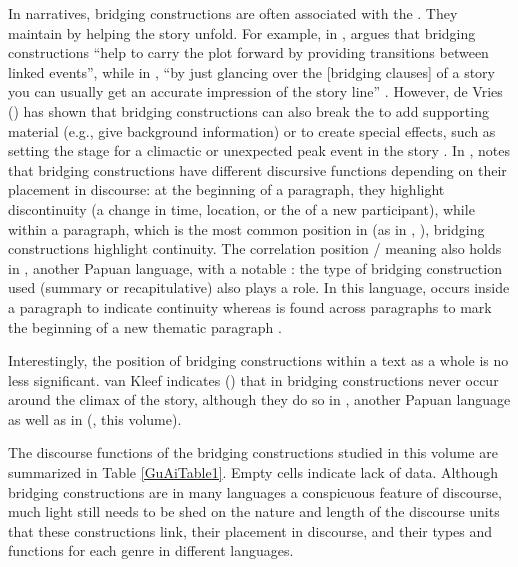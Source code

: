 \documentclass[output=paper]{LSP/langsci}
\begin{document}
In narratives, bridging constructions are often associated with the . They maintain  by helping the story unfold. For example, in , \citet[][1324]{Jendraschek09} argues that bridging constructions ``help to carry the plot forward by providing transitions between linked events'', while in , ``by just glancing over the [bridging clauses] of a story you can usually get an accurate impression of the story line''  \citep[][153]{kleef88}.  However, de Vries (\citeyear{devries.2005, devries.2006}) has shown that bridging constructions can also break the  to add supporting material (e.g., give background information) or to create special effects, such as setting the stage for a climactic or unexpected peak event in the story  \citep[][373]{devries.2005}. In ,  \citet[][151--152]{kleef88} notes that bridging constructions have different discursive functions depending on their placement in discourse: at the beginning of a paragraph, they highlight discontinuity (a change in time, location, or the  of a new participant), while within a paragraph, which is the most common position in  (as in , \citealt[][123]{Guillaume2011}), bridging constructions highlight continuity. The correlation position / meaning also holds in , another Papuan language, with a notable : the type of bridging construction used (summary or recapitulative) also plays a role. In this language,  occurs inside a paragraph to indicate continuity whereas  is found across paragraphs to mark the beginning of a new thematic paragraph \citep[][23--30]{logan08}.

Interestingly, the position of bridging constructions within a text as a whole is no less significant. van Kleef indicates (\citeyear[][152]{kleef88}) that in  bridging constructions never occur around the climax of the story, although they do so in , another Papuan language as well as in  (\citeauthor{guerinchap18}, this volume). 

The discourse functions of the bridging constructions studied in this volume are summarized in Table \ref{GuAiTable1}. Empty cells indicate lack of data. Although bridging constructions are in many languages a conspicuous feature of discourse, much light still needs to be shed on the nature and length of the discourse units that these constructions link, their placement in discourse, and their types and functions for each genre in different languages.
\end{document}
